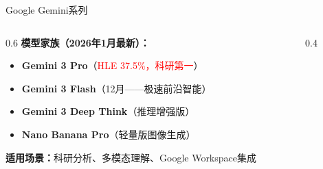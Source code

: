 \documentclass[aspectratio=169,11pt]{beamer}
\begin{document}
\begin{frame}{Google Gemini系列}
    \begin{columns}
        \begin{column}{0.6\textwidth}
            \textbf{模型家族（2026年1月最新）：}
            \begin{itemize}
                \item \textbf{Gemini 3 Pro}（\textcolor{red}{HLE 37.5\%，科研第一}）
                \item \textbf{Gemini 3 Flash}（12月——极速前沿智能）
                \item \textbf{Gemini 3 Deep Think}（推理增强版）
                \item \textbf{Nano Banana Pro}（轻量版图像生成）
            \end{itemize}
            
            \vspace{0.2cm}
            \textbf{适用场景：}科研分析、多模态理解、Google Workspace集成
        \end{column}
        \begin{column}{0.4\textwidth}
        \end{column}
    \end{columns}
\end{frame}
\end{document}
